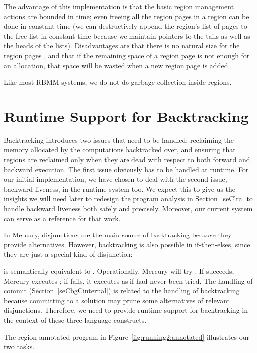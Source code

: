 \documentclass{tlp}
\begin{document}
The advantage of this implementation is that
the basic region management actions are bounded in time;
even freeing all the region pages in a region can be done in constant time
(we can destructively append the region's list of pages
to the free list in constant time
because we maintain pointers to the tails as well as the heads of the lists).
Disadvantages are that
there is no natural size for the region pages \cite{Tofte04Retro},
and that if the remaining space of a region page
is not enough for an allocation,
that space will be wasted when a new region page is added.

Like most RBMM systems,
we do not do garbage collection inside regions.

\section{Runtime Support for Backtracking}
\label{seCsupportnondet}

Backtracking introduces two issues that need to be handled:
reclaiming the memory allocated by the computations backtracked over, and
ensuring that regions are reclaimed only when they are dead
with respect to both forward and backward execution.
The first issue obviously has to be handled at runtime.
For our initial implementation,
we have chosen to deal with the second issue, backward liveness,
in the runtime system too.
We expect this to give us the insights we will need later
to redesign the program analysis in Section~\ref{seClra}
to handle backward liveness both safely and precisely.
Moreover, our current system can serve as a reference for that work.

In Mercury, disjunctions are the main source of backtracking
because they provide alternatives.
However, backtracking is also possible in if-then-elses,
since they are just a special kind of disjunction:

is semantically equivalent to
.
Operationally, Mercury will try .
If  succeeds, Mercury executes ;
if  fails, it executes  as if  had never been tried.
The handling of commit (Section~\ref{seCbgCinternal})
is related to the handling of backtracking
because committing to a solution may prune
some alternatives of relevant disjunctions.
Therefore, we need to provide runtime support for backtracking
in the context of these three language constructs.

The region-annotated program in Figure~\ref{fig:running2:annotated}
illustrates our two tasks.
\end{document}
